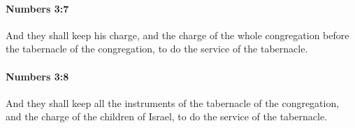 		\paragraph{Numbers 3:7} %
			\label{NUMBERS-3-7}

			And they shall keep his charge, and the charge of the whole congregation before the tabernacle of the congregation, to do the service of the tabernacle.


		\paragraph{Numbers 3:8} %
			\label{NUMBERS-3-8}

			And they shall keep all the instruments of the tabernacle of the congregation, and the charge of the children of Israel, to do the service of the tabernacle.


